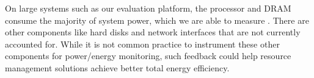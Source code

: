 On large systems such as our evaluation platform, the processor and DRAM consume the majority of system power, which we are able to measure \cite{RAPL,PCMGit}.
There are other components like hard disks and network interfaces that are not currently accounted for.
While it is not common practice to instrument these other components for power/energy monitoring, such feedback could help resource management solutions achieve better total energy efficiency.
